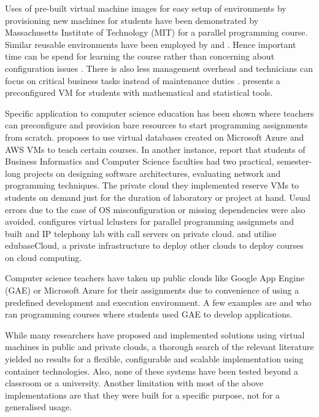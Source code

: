 \documentclass[DD]{iitmdiss}
\begin{document}
Uses of pre-built virtual machine images for easy setup of environments by provisioning new machines for students have been demonstrated  by Massachusetts Institute of Technology (MIT) \citep{ivica_starhpcteaching_2009} for a parallel programming course. Similar reusable environments have been employed by \cite{vaquero_educloud:_2011} and \cite{yuan_developing_2011}. Hence important time can be spend for learning the course rather than concerning about configuration issues \citep{ivica_starhpcteaching_2009}. There is also less management overhead and technicians can focus on critical business tasks instead of maintenance duties \citep{aljenaa_towards_2011}. \cite{chine_learning_2010} presents a preconfigured VM for students with mathematical and statistical tools.

Specific application to computer science education has been shown where teachers can preconfigure and provision bare resources to start programming assignments from scratch. \cite{rajaei_cloud_2012} proposes to use virtual databases created on Microsoft Azure and AWS VMs to teach certain courses. In another instance, \cite{doelitzscher_private_2011} report that students of Business Informatics and Computer Science faculties had two practical, semester-long projects on designing software architectures, evaluating network and programming techniques. The private cloud they implemented reserve VMs to students on demand just for the duration of laboratory or project at hand. Usual errors due to the case of OS misconfiguration or missing dependencies were also avoided. \cite{gomez-folgar_cloud_2012} configures virtual lclusters for parallel programming assignmets and \cite{yuan_developing_2011} built and IP telephony lab with call servers on private cloud. \cite{yokoyama_edubase_2012} and \cite{yokoyama_cloud_2012} utilise edubaseCloud, a private infrastructure to deploy other clouds to deploy courses on cloud computing.

Computer science teachers have taken up public clouds like Google App Engine (GAE) or Microsoft Azure for their assignments due to convenience of using a predefined development and execution environment. A few examples are \cite{bhattacharya_cloud-based_2011} and \cite{hollingsworth_teaching_2010} who ran programming courses where students used GAE to develop applications. 

While many researchers have proposed and implemented solutions using virtual machines in public and private clouds, a thorough search of the relevant literature yielded no results for a flexible, configurable and scalable implementation using container technologies. Also, none of these systems have been tested beyond a classroom or a university. Another limitation with most of the above implementations are that they were built for a specific purpose, not for a generalised usage. 
\end{document}
